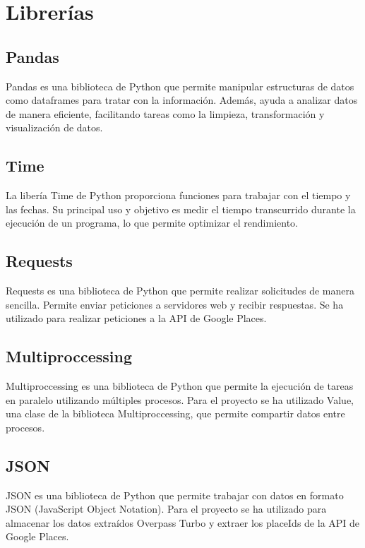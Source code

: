 \section{Librerías}

\subsection{Pandas}

Pandas es una biblioteca de Python que permite manipular estructuras de datos como dataframes para tratar con la información.
Además, ayuda a analizar datos de manera eficiente, facilitando tareas como la limpieza, transformación y visualización de datos.

\subsection{Time}

La libería Time de Python proporciona funciones para trabajar con el tiempo y las fechas.
Su principal uso y objetivo es medir el tiempo transcurrido durante la ejecución de un programa, lo que permite optimizar el rendimiento.

\subsection{Requests}

Requests es una biblioteca de Python que permite realizar solicitudes de manera sencilla.
Permite enviar peticiones a servidores web y recibir respuestas.
Se ha utilizado para realizar peticiones a la API de Google Places.

\subsection{Multiproccessing}

Multiproccessing es una biblioteca de Python que permite la ejecución de tareas en paralelo utilizando múltiples procesos.
Para el proyecto se ha utilizado Value, una clase de la biblioteca Multiproccessing, que permite compartir datos entre procesos.

\subsection{JSON}

JSON es una biblioteca de Python que permite trabajar con datos en formato JSON (JavaScript Object Notation).
Para el proyecto se ha utilizado para almacenar los datos extraídos Overpass Turbo y extraer los placeIds de la API de Google Places.

